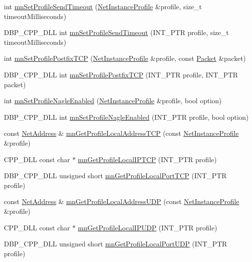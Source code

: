 \begin{DoxyCompactItemize}
\item 
int \hyperlink{group__proc_commands_gaa51770b52ce020dc00c3d2239acfb67d}{mnSetProfileSendTimeout} (\hyperlink{class_net_instance_profile}{NetInstanceProfile} \&profile, size\_\-t timeoutMilliseconds)
\item 
DBP\_\-CPP\_\-DLL int \hyperlink{group__proc_commands_ga8e6ae0d7fe3ea65af0df88b73c159d65}{mnSetProfileSendTimeout} (INT\_\-PTR profile, size\_\-t timeoutMilliseconds)
\item 
int \hyperlink{group__proc_commands_ga3eac7d2011d58116b7429d043f801327}{mnSetProfilePostfixTCP} (\hyperlink{class_net_instance_profile}{NetInstanceProfile} \&profile, const \hyperlink{class_packet}{Packet} \&packet)
\item 
DBP\_\-CPP\_\-DLL int \hyperlink{group__proc_commands_gaaef2c5f071939a37da436bd735a3356b}{mnSetProfilePostfixTCP} (INT\_\-PTR profile, INT\_\-PTR packet)
\item 
int \hyperlink{group__proc_commands_gaa586f7c1253e0a7dc2e6a7cfc1525fbb}{mnSetProfileNagleEnabled} (\hyperlink{class_net_instance_profile}{NetInstanceProfile} \&profile, bool option)
\item 
DBP\_\-CPP\_\-DLL int \hyperlink{group__proc_commands_gaf99afa35c05c5aa5a93447d36f2d3dc5}{mnSetProfileNagleEnabled} (INT\_\-PTR profile, bool option)
\item 
const \hyperlink{class_net_address}{NetAddress} \& \hyperlink{group__proc_commands_gacc21782108b1f441a5076f4d90ad9ab3}{mnGetProfileLocalAddressTCP} (const \hyperlink{class_net_instance_profile}{NetInstanceProfile} \&profile)
\item 
CPP\_\-DLL const char $\ast$ \hyperlink{group__proc_commands_gaaa746d348bcdafe679f538b67a22eb4e}{mnGetProfileLocalIPTCP} (INT\_\-PTR profile)
\item 
DBP\_\-CPP\_\-DLL unsigned short \hyperlink{group__proc_commands_gab6d79f3f40d30d817d4f80a9385493af}{mnGetProfileLocalPortTCP} (INT\_\-PTR profile)
\item 
const \hyperlink{class_net_address}{NetAddress} \& \hyperlink{group__proc_commands_ga6e57bb32ab2679f0b1c7cb345c04b2ef}{mnGetProfileLocalAddressUDP} (const \hyperlink{class_net_instance_profile}{NetInstanceProfile} \&profile)
\item 
CPP\_\-DLL const char $\ast$ \hyperlink{group__proc_commands_gaf3bed6301ac3f191316527f130c185ba}{mnGetProfileLocalIPUDP} (INT\_\-PTR profile)
\item 
DBP\_\-CPP\_\-DLL unsigned short \hyperlink{group__proc_commands_ga8b36e97c27d269a9653b53b1e447ecb1}{mnGetProfileLocalPortUDP} (INT\_\-PTR profile)

\end{DoxyCompactItemize}

